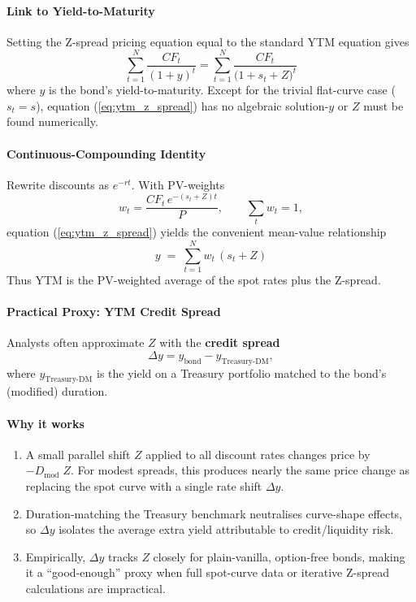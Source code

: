 \documentclass{article}
\begin{document}
\begin{appendices}
\paragraph*{Link to Yield-to-Maturity}
Setting the Z-spread pricing equation equal to the standard YTM equation gives
\begin{equation}
\label{eq:ytm_z_spread}
\sum_{t=1}^{N}\frac{CF_t}{(1+y)^t}
=\sum_{t=1}^{N}\frac{CF_t}{\bigl(1+s_t+Z\bigr)^t}
\end{equation}
where $y$ is the bond's yield-to-maturity. Except for the trivial flat-curve case ($s_t=s$), equation (\ref{eq:ytm_z_spread}) has no algebraic solution-$y$ or $Z$ must be found numerically.

\paragraph*{Continuous-Compounding Identity}
Rewrite discounts as $e^{-r t}$. With PV-weights
\begin{equation*}
w_t=\frac{CF_t\,e^{-(s_t+Z)t}}{P},\qquad\sum_{t}w_t=1,
\end{equation*}
equation (\ref{eq:ytm_z_spread}) yields the convenient mean-value relationship
\begin{equation}
y \;=\; \sum_{t=1}^{N} w_t\,(s_t+Z)\tag{A2}
\end{equation}
Thus YTM is the PV-weighted average of the spot rates plus the Z-spread.

\paragraph*{Practical Proxy: YTM Credit Spread}
Analysts often approximate $Z$ with the \textbf{credit spread}
\begin{equation*}
\Delta y = y_{\text{bond}} - y_{\text{Treasury-DM}},
\end{equation*}
where $y_{\text{Treasury-DM}}$ is the yield on a Treasury portfolio matched to the bond's (modified) duration.

\paragraph*{Why it works}
\begin{enumerate}
    \item A small parallel shift $Z$ applied to all discount rates changes price by $-D_{\text{mod}}\;Z$. For modest spreads, this produces nearly the same price change as replacing the spot curve with a single rate shift $\Delta y$.
    \item Duration-matching the Treasury benchmark neutralises curve-shape effects, so $\Delta y$ isolates the average extra yield attributable to credit/liquidity risk.
    \item Empirically, $\Delta y$ tracks $Z$ closely for plain-vanilla, option-free bonds, making it a ``good-enough'' proxy when full spot-curve data or iterative Z-spread calculations are impractical.
\end{enumerate}


\end{appendices}
\end{document}
